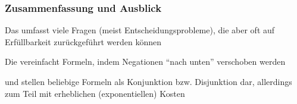 \documentclass[aspectratio=1610,onlymath]{beamer}
\begin{document}
\begin{frame}\frametitle{Zusammenfassung und Ausblick}

Das  umfasst viele Fragen (meist Entscheidungsprobleme), die aber oft
auf Erfüllbarkeit zurückgeführt werden können
\bigskip

Die  vereinfacht Formeln, indem Negationen "`nach unten"' verschoben werden
\bigskip

 und  stellen beliebige Formeln als Konjunktion bzw. Disjunktion dar, allerdings zum Teil mit erheblichen (exponentiellen) Kosten\bigskip

% 


\end{frame}
\end{document}
